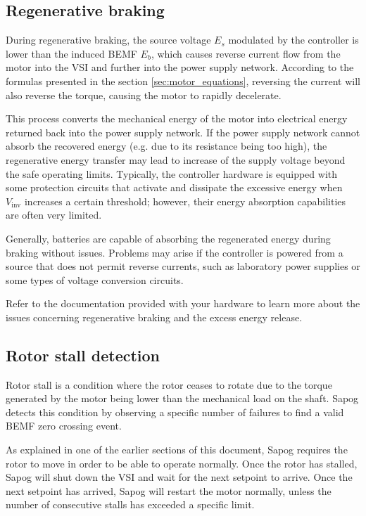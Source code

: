\documentclass{zubaxdoc}
\begin{document}
\subsection{Regenerative braking}

During regenerative braking, the source voltage $E_s$ modulated by the controller is lower than the
induced BEMF $E_b$, which causes reverse current flow from the motor into the VSI
and further into the power supply network.
According to the formulas presented in the section \ref{sec:motor_equations},
reversing the current will also reverse the torque, causing the motor to rapidly decelerate.

This process converts the mechanical energy of the motor into electrical energy returned back into the
power supply network.
If the power supply network cannot absorb the recovered energy (e.g. due to its resistance being too high),
the regenerative energy transfer may lead to increase of the supply voltage beyond the safe operating limits.
Typically, the controller hardware is equipped with some protection circuits that activate and dissipate the
excessive energy when $V_\text{inv}$ increases a certain threshold;
however, their energy absorption capabilities are often very  limited.

Generally, batteries are capable of absorbing the regenerated energy during braking without issues.
Problems may arise if the controller is powered from a source that does not permit reverse currents,
such as laboratory power supplies or some types of voltage conversion circuits.

Refer to the documentation provided with your hardware to learn more about the issues
concerning regenerative braking and the excess energy release.

\subsection{Rotor stall detection}

Rotor stall is a condition where the rotor ceases to rotate due to the torque generated by the motor
being lower than the mechanical load on the shaft.
Sapog detects this condition by observing a specific number of failures to find
a valid BEMF zero crossing event.

As explained in one of the earlier sections of this document,
Sapog requires the rotor to move in order to be able to operate normally.
Once the rotor has stalled, Sapog will shut down the VSI and wait for the next setpoint to arrive.
Once the next setpoint has arrived, Sapog will restart the motor normally,
unless the number of consecutive stalls has exceeded a specific limit.
\end{document}
